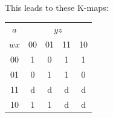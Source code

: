 \documentclass[10pt,a4paper]{scrartcl}
\begin{document}
This leads to these K-maps:\\
\begin{tabular}{|c||c|c|c|c|}
  \hline
 $a$     & \multicolumn{4}{c|}{$yz$} \\
  $wx$   & 00                 & 01                 & 11                 & 10                 \\ \hline\hline
  00     & \cellcolor{gray}1  & \cellcolor{gray}0  & \cellcolor{gray}1  & \cellcolor{gray}1  \\ \hline
  01     &                 0  &                 1  &                 1  &                 0  \\ \hline
  11     &                 d  &                 d  &                 d  &                 d  \\ \hline
  10     &                 1  &                 1  &                 d  &                 d  \\ \hline
\end{tabular}
\FloatBarrier
\end{document}
